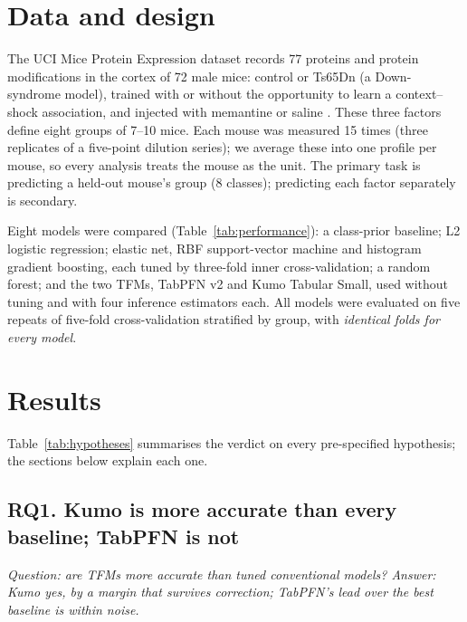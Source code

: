 \documentclass[10pt]{article}
\begin{document}
\section{Data and design}

The UCI Mice Protein Expression dataset \cite{uci2015} records 77 proteins and protein
modifications in the cortex of 72 male mice: control or Ts65Dn (a Down-syndrome model), trained
with or without the opportunity to learn a context--shock association, and injected with
memantine or saline \cite{ahmed2015, higuera2015}. These three factors define eight groups of
7--10 mice. Each mouse was measured 15 times (three replicates of a five-point dilution series);
we average these into one profile per mouse, so every analysis treats the mouse as the unit.
The primary task is predicting a held-out mouse's group (8 classes); predicting each factor
separately is secondary.

Eight models were compared (Table~\ref{tab:performance}): a class-prior baseline; L2 logistic
regression; elastic net, RBF support-vector machine and histogram gradient boosting, each tuned
by three-fold inner cross-validation; a random forest; and the two TFMs, TabPFN v2 and Kumo
Tabular Small, used without tuning and with four inference estimators each. All models were evaluated on five repeats of five-fold
cross-validation stratified by group, with \emph{identical folds for every model}.

\section{Results}

Table~\ref{tab:hypotheses} summarises the verdict on every pre-specified hypothesis; the sections
below explain each one.

\begin{table}[h]
\centering
\caption{\textbf{Verdicts on the pre-specified hypotheses.} Rules are stated in Methods and were
fixed before the experiments. H1, H2 and H4c were written knowing an earlier benchmark on the
same data, so they are informed rather than blind; H3, H4a and H4b were blind.}
\label{tab:hypotheses}
\small

\end{table}

\subsection{RQ1. Kumo is more accurate than every baseline; TabPFN is not}
\textit{Question: are TFMs more accurate than tuned conventional models? Answer: Kumo yes, by a
margin that survives correction; TabPFN's lead over the best baseline is within noise.}
\end{document}
